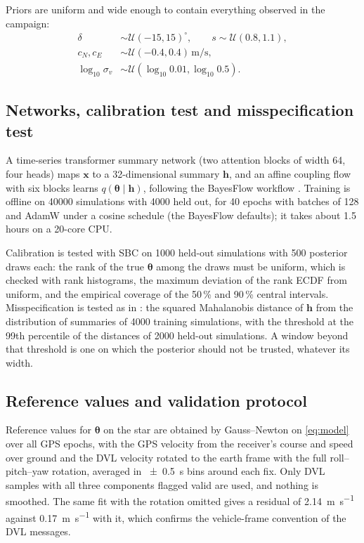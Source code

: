 \documentclass[conference]{IEEEtran}
\newcommand{\vect}[1]{\boldsymbol{#1}}
\newcommand{\btheta}{\vect{\theta}}
\newcommand{\bx}{\vect{x}}
\begin{document}
Priors are uniform and wide enough to contain everything observed in the campaign:
\begin{equation}
\begin{aligned}
\delta &\sim \mathcal{U}(-15, 15)^{\circ}, \qquad s \sim \mathcal{U}(0.8, 1.1),\\
c_N, c_E &\sim \mathcal{U}(-0.4, 0.4)\,\si{\meter\per\second},\\
\log_{10}\sigma_v &\sim \mathcal{U}(\log_{10} 0.01, \log_{10} 0.5).
\end{aligned}
\end{equation}

\subsection{Networks, calibration test and misspecification test}

A time-series transformer summary network (two attention blocks of width 64, four heads) maps $\bx$ to a 32-dimensional summary $\vect{h}$, and an affine coupling flow with six blocks learns $q(\btheta \mid \vect{h})$, following the BayesFlow workflow \cite{radev2022bayesflow,radev2023joss}. Training is offline on \num{40000} simulations with \num{4000} held out, for 40 epochs with batches of 128 and AdamW under a cosine schedule (the BayesFlow defaults); it takes about 1.5 hours on a 20-core CPU.

Calibration is tested with SBC \cite{talts2018sbc} on \num{1000} held-out simulations with 500 posterior draws each: the rank of the true $\btheta$ among the draws must be uniform, which is checked with rank histograms, the maximum deviation of the rank ECDF from uniform, and the empirical coverage of the 50\,\% and 90\,\% central intervals. Misspecification is tested as in \cite{schmitt2023misspecification}: the squared Mahalanobis distance of $\vect{h}$ from the distribution of summaries of \num{4000} training simulations, with the threshold at the 99th percentile of the distances of \num{2000} held-out simulations. A window beyond that threshold is one on which the posterior should not be trusted, whatever its width.

\subsection{Reference values and validation protocol}

Reference values for $\btheta$ on the star are obtained by Gauss--Newton on \eqref{eq:model} over all GPS epochs, with the GPS velocity from the receiver's course and speed over ground and the DVL velocity rotated to the earth frame with the full roll--pitch--yaw rotation, averaged in \SI{\pm 0.5}{\second} bins around each fix. Only DVL samples with all three components flagged valid are used, and nothing is smoothed. The same fit with the rotation omitted gives a residual of \SI{2.14}{\meter\per\second} against \SI{0.17}{\meter\per\second} with it, which confirms the vehicle-frame convention of the DVL messages.
\end{document}

